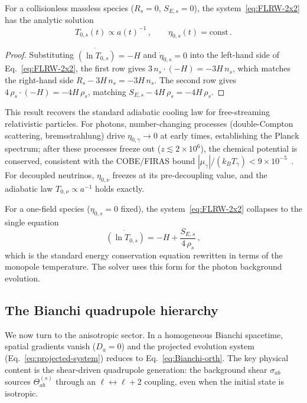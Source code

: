 \begin{proposition}
\label{prop:FLRW-adiabatic}
For a collisionless massless species ($R_s = 0$,
$S_{E,s} = 0$), the system~\eqref{eq:FLRW-2x2}
has the analytic solution
\begin{equation}\label{eq:adiabatic-solution}
T_{0,s}(t) \propto a(t)^{-1}\,,
\qquad
\eta_{0,s}(t) = \text{const}\,.
\end{equation}
\end{proposition}

\begin{proof}
Substituting $\dot{(\ln T_{0,s})} = -H$ and
$\dot{\eta}_{0,s} = 0$ into the left-hand side of
Eq.~\eqref{eq:FLRW-2x2}, the first row gives
$3\,n_s \cdot (-H) = -3H\,n_s$, which matches
the right-hand side $R_s - 3H\,n_s = -3H\,n_s$.
The second row gives
$4\,\rho_s \cdot (-H) = -4H\,\rho_s$, matching
$S_{E,s} - 4H\,\rho_s = -4H\,\rho_s$.
\end{proof}

This result recovers the standard adiabatic cooling
law for free-streaming relativistic particles.  For
photons, number-changing processes
(double-Compton scattering, bremsstrahlung) drive
$\eta_{0,\gamma} \to 0$ at early times, establishing
the Planck spectrum; after these processes freeze
out ($z \lesssim 2 \times 10^6$), the chemical
potential is conserved, consistent with the COBE/FIRAS
bound $|\mu_\gamma|/(k_B T_\gamma) < 9 \times
10^{-5}$~\cite{Fixsen1996}.  For decoupled neutrinos,
$\eta_{0,\nu}$ freezes at its pre-decoupling value,
and the adiabatic law $T_{0,\nu} \propto a^{-1}$
holds exactly.

For a one-field species ($\eta_{0,s} = 0$ fixed),
the system~\eqref{eq:FLRW-2x2} collapses to the
single equation
\begin{equation}\label{eq:FLRW-1field}
\dot{(\ln T_{0,s})} = -H + \frac{S_{E,s}}{4\,\rho_s}\,,
\end{equation}
which is the standard energy conservation equation
rewritten in terms of the monopole temperature.  The
solver uses this form for the photon background
evolution.


\subsection{The Bianchi quadrupole hierarchy}
\label{sec:bianchi-quad}

We now turn to the anisotropic sector.  In a
homogeneous Bianchi spacetime, spatial gradients vanish
($D_a = 0$) and the projected evolution system
(Eq.~\ref{eq:projected-system}) reduces to
Eq.~\eqref{eq:Bianchi-orth}.  The key physical
content is the shear-driven quadrupole generation:
the background shear $\sigma_{ab}$ sources
$\Theta^{(s)}_{ab}$ through an
$\ell \leftrightarrow \ell + 2$ coupling, even when
the initial state is isotropic.

